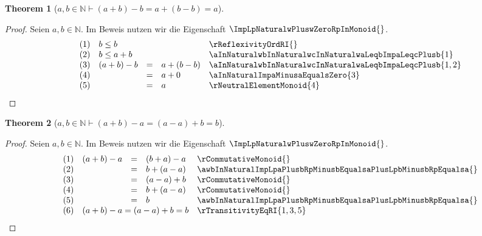 \documentclass{book}
\theoremstyle{plain}
\newtheorem{theorem}{Theorem}
\theoremstyle{remark}
\theoremstyle{definition}
\begin{document}
\label{awbInNaturalImpLpaPlusbRpMinusbEqualsaPlusLpbMinusbRpEqualsa}
\begin{theorem}[\(a,b\in\mathbb{N}\vdash (a+b)-b=a+(b-b)=a\)]
\end{theorem}
\begin{proof}
Seien \(a, b \in \mathbb{N}\). Im Beweis nutzen wir die Eigenschaft \(\ImpLpNaturalwPluswZeroRpInMonoid{}\).
\[
\begin{array}{llclll}
             & (1) & \multicolumn{3}{l}{b\leq b}  & \rReflexivityOrdRI{} \\
             & (2) & \multicolumn{3}{l}{b\leq a+b}  & \aInNaturalwbInNaturalwcInNaturalwaLeqbImpaLeqcPlusb{1} \\
             & (3) & (a+b)-b&=&a+(b-b)  & \aInNaturalwbInNaturalwcInNaturalwaLeqbImpaLeqcPlusb{1,2} \\
             & (4) &  &=&a+0  & \aInNaturalImpaMinusaEqualsZero{3} \\
             & (5) &  &=&a  & \rNeutralElementMonoid{4} \\
\end{array}
\]
\end{proof}

\label{awbInNaturalImpLpaPlusbRpMinusaEqualsLpaMinusaRpPlusbEqualsb}
\begin{theorem}[\(a,b\in\mathbb{N}\vdash (a+b)-a=(a-a)+b=b\)]
\end{theorem}
\begin{proof}
Seien \(a, b \in \mathbb{N}\). Im Beweis nutzen wir die Eigenschaft \(\ImpLpNaturalwPluswZeroRpInMonoid{}\).
\[
\begin{array}{llclll}
             & (1) & (a+b)-a&=&(b+a)-a  & \rCommutativeMonoid{} \\
             & (2) & &=& b+(a-a)  & \awbInNaturalImpLpaPlusbRpMinusbEqualsaPlusLpbMinusbRpEqualsa{} \\
             & (3) & &=& (a-a)+b  & \rCommutativeMonoid{} \\
             & (4) & &=& b+(a-a)  & \rCommutativeMonoid{} \\
             & (5) & &=& b  & \awbInNaturalImpLpaPlusbRpMinusbEqualsaPlusLpbMinusbRpEqualsa{} \\
             & (6) & \multicolumn{3}{l}{(a+b)-a=(a-a)+b=b}  & \rTransitivityEqRI{1,3,5} \\
\end{array}
\]
\end{proof}
\end{document}
